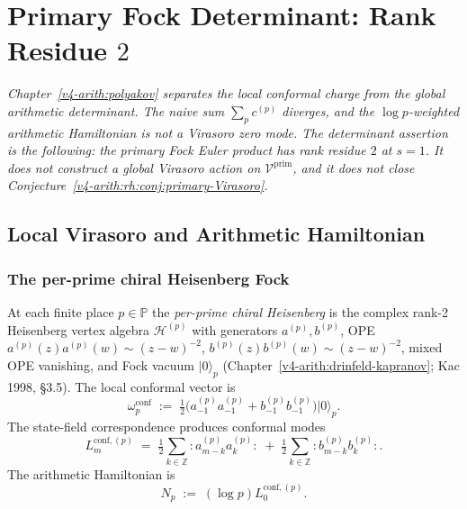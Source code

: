 \chapter{Primary Fock Determinant: Rank Residue \(2\)}
\label{v4-arith:w9-r3:chapter}

\emph{Chapter~\ref{v4-arith:polyakov} separates the local conformal
charge from the global arithmetic determinant. The naive sum
\(\sum_{p}c^{(p)}\) diverges, and the \(\log p\)-weighted arithmetic
Hamiltonian is not a Virasoro zero mode. The determinant assertion is
the following: the primary Fock Euler product has
rank residue \(2\) at \(s=1\). It does not construct a global Virasoro
action on \(\mathcal{V}^{\mathrm{prim}}\), and it does not close
Conjecture~\ref{v4-arith:rh:conj:primary-Virasoro}.}

\section{Local Virasoro and Arithmetic Hamiltonian}
\label{v4-arith:w9-r3:local}

\subsection{The per-prime chiral Heisenberg Fock}
\label{v4-arith:w9-r3:per-prime-fock}

\begin{definition}
\label{v4-arith:w9-r3:def:per-prime}
At each finite place \(p\in\mathbb{P}\) the
\emph{per-prime chiral Heisenberg} is the complex rank-2 Heisenberg
vertex algebra \(\mathcal{H}^{(p)}\) with generators \(a^{(p)},b^{(p)}\), OPE
\(a^{(p)}(z)a^{(p)}(w)\sim (z-w)^{-2}\),
\(b^{(p)}(z)b^{(p)}(w)\sim (z-w)^{-2}\), mixed OPE vanishing, and Fock
vacuum \(|0\rangle_{p}\)
(Chapter~\ref{v4-arith:drinfeld-kapranov}; Kac 1998, \S 3.5).
The local conformal vector is
\begin{equation}
\label{v4-arith:w9-r3:eq:omega-p}
\omega_{p}^{\mathrm{conf}}\;:=\;\tfrac{1}{2}\bigl(a_{-1}^{(p)}a_{-1}^{(p)}+b_{-1}^{(p)}b_{-1}^{(p)}\bigr)|0\rangle_{p}.
\end{equation}
The state-field correspondence produces conformal modes
\begin{equation}
\label{v4-arith:w9-r3:eq:L-m-p}
L_{m}^{\mathrm{conf},(p)}\;=\;\tfrac{1}{2}\sum_{k\in\mathbb{Z}}{:}a_{m-k}^{(p)}a_{k}^{(p)}{:}\;+\;\tfrac{1}{2}\sum_{k\in\mathbb{Z}}{:}b_{m-k}^{(p)}b_{k}^{(p)}{:}.
\end{equation}
The arithmetic Hamiltonian is
\begin{equation}
\label{v4-arith:w9-r3:eq:N-p}
N_{p}\;:=\;(\log p)L_{0}^{\mathrm{conf},(p)}.
\end{equation}
\end{definition}

